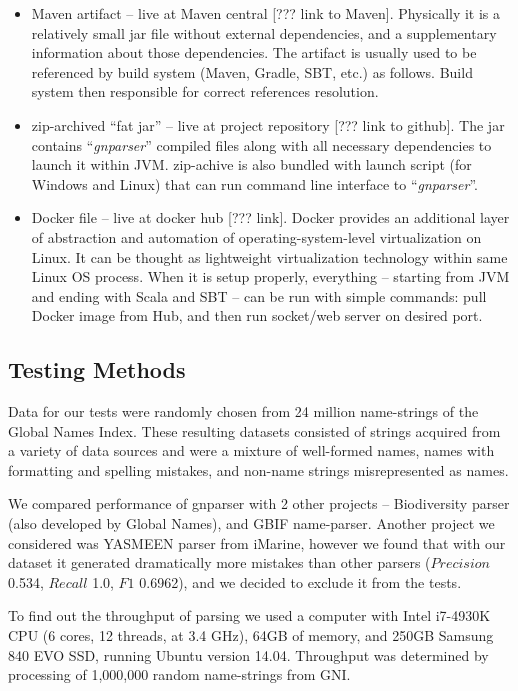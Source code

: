 \documentclass{bmcart}
\begin{document}
\begin{itemize}
  \item Maven artifact -- live at Maven central [??? link to Maven].
  Physically it is a relatively small jar file without external dependencies,
  and a supplementary information about those dependencies. The artifact is
  usually used to be referenced by build system (Maven, Gradle, SBT, etc.) as
  follows. Build system then responsible for correct references resolution.
  \item zip-archived ``fat jar'' -- live at project repository [??? link to
  github]. The jar contains ``\textit{gnparser}'' compiled files along with
  all necessary dependencies to launch it within JVM. zip-achive is also
  bundled with launch script (for Windows and Linux) that can run command line
  interface to ``\textit{gnparser}''.
  \item Docker file -- live at docker hub [??? link]. Docker provides an
  additional layer of abstraction and automation of operating-system-level
  virtualization on Linux. It can be thought as lightweight virtualization
  technology within same Linux OS process. When it is setup properly,
  everything -- starting from JVM and ending with Scala and SBT -- can be run
  with simple commands: pull Docker image from Hub, and then run socket/web
  server on desired port.
\end{itemize}

\subsection*{Testing Methods}

Data for our tests were randomly chosen from 24 million name-strings of the
Global Names Index. These resulting datasets consisted of strings acquired
from a variety of data sources and were a mixture of well-formed names, names
with formatting and spelling mistakes, and non-name strings misrepresented as
names.

We compared performance of gnparser with 2 other projects -- Biodiversity
parser\cite{biodiversity} (also developed by Global Names), and GBIF
name-parser\cite{gbifNameParser}. Another project we considered was YASMEEN
parser from iMarine\cite{VandenBerghe2015}, however we found that with our
dataset it generated dramatically more mistakes than other parsers
($Precision$ 0.534, $Recall$ 1.0, $F1$ 0.6962), and we decided to exclude it
from the tests.

To find out the throughput of parsing we used a computer with Intel i7-4930K
CPU (6 cores, 12 threads, at 3.4 GHz), 64GB of memory, and 250GB Samsung 840
EVO SSD, running Ubuntu version 14.04. Throughput was determined by processing
of 1,000,000 random name-strings from GNI.
\end{document}

